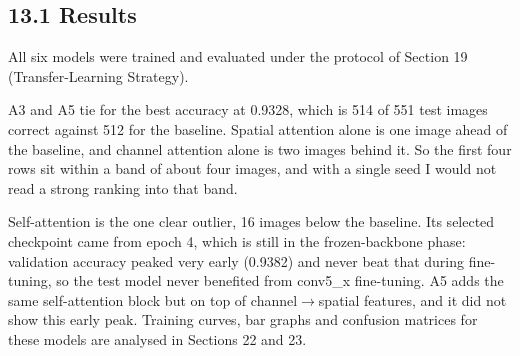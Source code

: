 \documentclass[10pt]{article}
\begin{document}
\subsection*{13.1 Results}

All six models were trained and evaluated under the protocol of Section 19
(Transfer-Learning Strategy).

\begin{center}
\end{center}

A3 and A5 tie for the best accuracy at 0.9328, which is 514 of 551 test images
correct against 512 for the baseline. Spatial attention alone is one image ahead
of the baseline, and channel attention alone is two images behind it. So the
first four rows sit within a band of about four images, and with a single seed
I would not read a strong ranking into that band.

Self-attention is the one clear outlier, 16 images below the baseline. Its
selected checkpoint came from epoch 4, which is still in the frozen-backbone
phase: validation accuracy peaked very early (0.9382) and never beat that
during fine-tuning, so the test model never benefited from conv5\_x
fine-tuning. A5 adds the same self-attention block but on top of
channel$\rightarrow$spatial features, and it did not show this early peak.
Training curves, bar graphs and confusion matrices for these models are
analysed in Sections 22 and 23.
\end{document}
